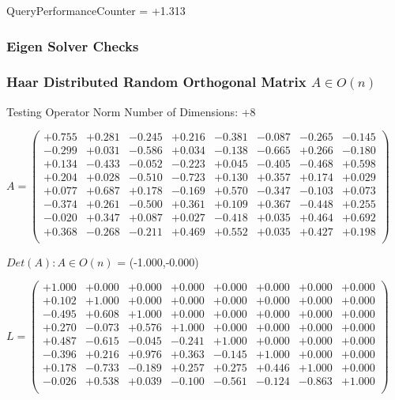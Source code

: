 \documentclass[9pt]{article}
\theoremstyle{plain}
\theoremstyle{definition}
\theoremstyle{remark}
\numberwithin{equation}{section}
\begin{document}
QueryPerformanceCounter  =  +1.313
\subsubsection{Eigen Solver Checks}
\subsubsection{Haar Distributed Random Orthogonal Matrix $A \in O(n)$}
 Testing Operator Norm
Number of Dimensions: +8

$A = \left(
\begin{array}{
cccccccc}
+0.755 & +0.281 & -0.245 & +0.216 & -0.381 & -0.087 & -0.265 & -0.145 \\
-0.299 & +0.031 & -0.586 & +0.034 & -0.138 & -0.665 & +0.266 & -0.180 \\
+0.134 & -0.433 & -0.052 & -0.223 & +0.045 & -0.405 & -0.468 & +0.598 \\
+0.204 & +0.028 & -0.510 & -0.723 & +0.130 & +0.357 & +0.174 & +0.029 \\
+0.077 & +0.687 & +0.178 & -0.169 & +0.570 & -0.347 & -0.103 & +0.073 \\
-0.374 & +0.261 & -0.500 & +0.361 & +0.109 & +0.367 & -0.448 & +0.255 \\
-0.020 & +0.347 & +0.087 & +0.027 & -0.418 & +0.035 & +0.464 & +0.692 \\
+0.368 & -0.268 & -0.211 & +0.469 & +0.552 & +0.035 & +0.427 & +0.198 \\
\end{array}
\right)$ \newline 

$Det(A) :   A \in O(n)$ = (-1.000,-0.000)

$L = \left(
\begin{array}{
cccccccc}
+1.000 & +0.000 & +0.000 & +0.000 & +0.000 & +0.000 & +0.000 & +0.000 \\
+0.102 & +1.000 & +0.000 & +0.000 & +0.000 & +0.000 & +0.000 & +0.000 \\
-0.495 & +0.608 & +1.000 & +0.000 & +0.000 & +0.000 & +0.000 & +0.000 \\
+0.270 & -0.073 & +0.576 & +1.000 & +0.000 & +0.000 & +0.000 & +0.000 \\
+0.487 & -0.615 & -0.045 & -0.241 & +1.000 & +0.000 & +0.000 & +0.000 \\
-0.396 & +0.216 & +0.976 & +0.363 & -0.145 & +1.000 & +0.000 & +0.000 \\
+0.178 & -0.733 & -0.189 & +0.257 & +0.275 & +0.446 & +1.000 & +0.000 \\
-0.026 & +0.538 & +0.039 & -0.100 & -0.561 & -0.124 & -0.863 & +1.000 \\
\end{array}
\right)$ \newline 
\end{document}

